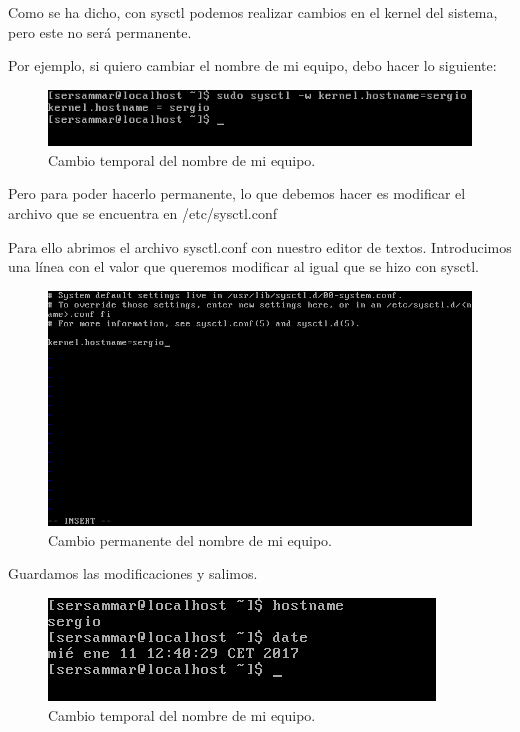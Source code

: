 Como se ha dicho, con sysctl podemos realizar cambios en el kernel del sistema, pero este no será permanente.

Por ejemplo, si quiero cambiar el nombre de mi equipo, debo hacer lo siguiente:

\begin{figure}[H] %
	\centering
	\includegraphics[scale=0.5]{imagenes/sys.png}  %
	\caption{Cambio temporal del nombre de mi equipo.} \label{fig:figura1}
\end{figure}

Pero para poder hacerlo permanente, lo que debemos hacer es modificar el archivo que se encuentra en /etc/sysctl.conf  \cite{sysctl}

Para ello abrimos el archivo sysctl.conf con nuestro editor de textos.
Introducimos una línea con el  valor que queremos modificar al igual que se hizo con sysctl.

\begin{figure}[H] %
	\centering
	\includegraphics[scale=0.5]{imagenes/perma.png}  %
	\caption{Cambio permanente del nombre de mi equipo.} \label{fig:figura2}
\end{figure}

Guardamos las modificaciones y salimos.

\begin{figure}[H] %
	\centering
	\includegraphics[scale=0.5]{imagenes/nombre-prev.png}  %
	\caption{Cambio temporal del nombre de mi equipo.} \label{fig:figura3}
\end{figure}

